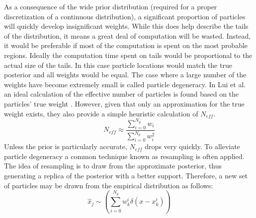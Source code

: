 As a consequence 
of the wide prior distribution (required for a proper discretization of a continuous
distribution), a significant proportion of particles will quickly
develop insignificant weights. 
While this does help
describe the tails of the distribution, it means a great deal of computation will be wasted.
Instead, it would be preferable if most of the computation is spent on the most probable regions.
Ideally the computation time spent on tails would be proportional to the actual size of the
tails. In this case particle locations would match the true posterior and all weights would
be equal.  The case where a large number of the weights have become extremely small
is called particle degeneracy. In  Lui et al. 
an ideal calculation of the effective number of particles is found based on the 
particles' true weight \cite{Liu1998}. However, given that only an approximation 
for the true weight 
exists, they also provide a simple heuristic calculation of $N_{eff}$.
\begin{equation}
N_{eff} \approx \frac{\sum_{i=0}^{N_p} w_i}{\sum_{i=0}^{N_p} w_i^2}
\label{eq:neff}
\end{equation}
Unless the prior is particularly accurate,
$N_{eff}$ drops very quickly.  To alleviate particle degeneracy
a common technique known as resampling is often applied. The idea of resampling is to 
draw from the approximate posterior, thus generating a replica of the posterior with 
a better support. Therefore, a new set of particles may be drawn from the empirical
distribution as follows:
\begin{equation}
\hat{x}_j \sim \left(\sum_{i=0}^{N_p} w^i_k\delta(x - x^i_k)\right)
\end{equation}

